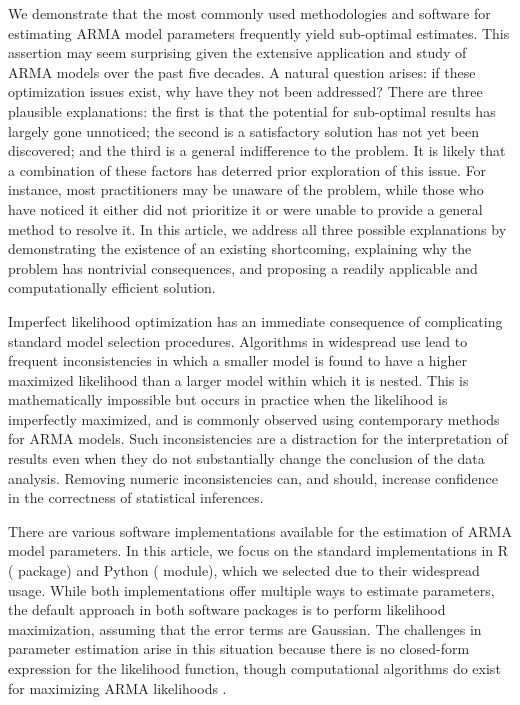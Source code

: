 We demonstrate that the most commonly used methodologies and software for estimating ARMA model parameters frequently yield sub-optimal estimates.
This assertion may seem surprising given the extensive application and study of ARMA models over the past five decades.
A natural question arises: if these optimization issues exist, why have they not been addressed?
There are three plausible explanations: the first is that the potential for sub-optimal results has largely gone unnoticed; the second is a satisfactory solution has not yet been discovered; and the third is a general indifference to the problem.
It is likely that a combination of these factors has deterred prior exploration of this issue.
For instance, most practitioners may be unaware of the problem, while those who have noticed it either did not prioritize it or were unable to provide a general method to resolve it.
In this article, we address all three possible explanations by demonstrating the existence of an existing shortcoming, explaining why the problem has nontrivial consequences, and proposing a readily applicable and computationally efficient solution.

Imperfect likelihood optimization has an immediate consequence of complicating standard model selection procedures.
Algorithms in widespread use lead to frequent inconsistencies in which a smaller model is found to have a higher maximized likelihood than a larger model within which it is nested.
This is mathematically impossible but occurs in practice when the likelihood is imperfectly maximized, and is commonly observed using contemporary methods for ARMA models.
Such inconsistencies are a distraction for the interpretation of results even when they do not substantially change the conclusion of the data analysis.
Removing numeric inconsistencies can, and should, increase confidence in the correctness of statistical inferences.

There are various software implementations available for the estimation of ARMA model parameters.
In this article, we focus on the standard implementations in R ( package) and Python ( module), which we selected due to their widespread usage.
While both implementations offer multiple ways to estimate parameters, the default approach in both software packages is to perform likelihood maximization, assuming that the error terms are Gaussian.
The challenges in parameter estimation arise in this situation because there is no closed-form expression for the likelihood function, though computational algorithms do exist for maximizing ARMA likelihoods \cite{gardner1980}.

